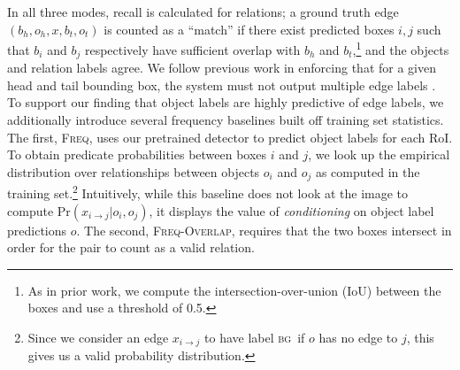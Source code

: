 \documentclass[10pt,twocolumn,letterpaper]{article}
\DeclareMathOperator*{\argmax}{argmax}
\newcommand{\rowan}[1]{{\color{red}rz:[#1]}}
\newcommand{\bg}{\textsc{bg}}  %
\begin{document}
In all three modes, recall is calculated for relations; a ground truth edge $(b_h, o_h, x, b_t, o_t)$ is counted as a ``match'' if there exist predicted boxes $i,j$ such that $b_i$ and $b_j$ respectively have sufficient overlap with $b_h$ and $b_t$,\footnote{As in prior work, we compute the intersection-over-union (IoU) between the boxes and use a threshold of 0.5.} and the objects and relation labels agree.
We follow previous work in enforcing that for a given head and tail bounding box, the system must not output multiple edge labels \cite{xu_scene_2017, lu_visual_2016}.
To support our finding that object labels are highly predictive of edge labels, we additionally introduce several frequency baselines built off training set statistics. The first, \textsc{Freq}, uses our pretrained detector to predict object labels for each RoI. To obtain predicate probabilities between boxes $i$ and $j$, we look up the empirical distribution over relationships between objects $o_i$ and $o_j$ as computed in the training set.\footnote{Since we consider an edge $x_{i \to j}$ to have label \bg\ if $o$ has no edge to $j$, this gives us a valid probability distribution.} Intuitively, while this baseline does not look at the image to compute $\textrm{Pr}(x_{i\to j} | o_i, o_j)$, it displays the value of \emph{conditioning} on object label predictions $o$. The second, \textsc{Freq-Overlap}, requires that the two boxes intersect in order for the pair to count as a valid relation.
\end{document}
